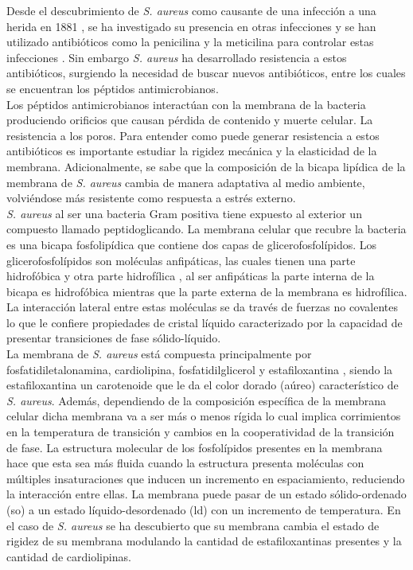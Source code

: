 \documentclass[%
 reprint,
 amsmath,amssymb,
 aps,
]{revtex4-2}
\begin{document}
Desde el descubrimiento de \textit{S. aureus} como causante de una infecci\'{o}n a una herida en 1881 \cite{Orent2006AMagazine}, se ha investigado su presencia en otras infecciones y se han utilizado antibi\'{o}ticos como la penicilina y la meticilina para controlar estas infecciones \cite{1HarpavatS.NissimS.LipppincottsMicrocards:MicrobiologyFlashCards2012.}. Sin embargo \textit{S. aureus} ha desarrollado resistencia a estos antibi\'{o}ticos,  surgiendo la necesidad de buscar nuevos antibi\'{o}ticos, entre los cuales se encuentran los p\'{e}ptidos antimicrobianos.\\
Los p\'{e}ptidos antimicrobianos interact\'{u}an con la membrana de la bacteria produciendo orificios que causan p\'{e}rdida de contenido y muerte celular. La resistencia a los poros. Para entender como puede generar resistencia a estos antibi\'{o}ticos es importante estudiar la rigidez mec\'{a}nica y la elasticidad de la membrana. Adicionalmente, se sabe que la composici\'{o}n de la bicapa lip\'{i}dica de la membrana de \textit{S. aureus} cambia de manera adaptativa al medio ambiente, volvi\'{e}ndose m\'{a}s resistente como respuesta a estr\'{e}s externo.\\
\textit{S. aureus} al ser una bacteria Gram positiva tiene expuesto al exterior un compuesto llamado peptidoglicando. La membrana celular que recubre la bacteria es una bicapa fosfolip\'{i}dica que contiene dos capas de glicerofosfol\'{i}pidos. Los glicerofosfol\'{i}pidos son mol\'{e}culas anfip\'{a}ticas, las cuales tienen una parte hidrof\'{o}bica y otra parte hidrof\'{i}lica \cite{Nelson2011}, al ser anfip\'{a}ticas la parte interna de la bicapa es hidrof\'{o}bica mientras que la parte externa de la membrana es hidrof\'{i}lica. La interacci\'{o}n lateral entre estas mol\'{e}culas se da trav\'{e}s de fuerzas no covalentes lo que le confiere propiedades de cristal l\'{i}quido caracterizado por la capacidad de presentar transiciones de fase s\'{o}lido-l\'{i}quido. \\
La membrana de \textit{S. aureus} est\'{a} compuesta principalmente por  fosfatidiletalonamina, cardiolipina, fosfatidilglicerol y estafiloxantina \cite{Ocampo2010TheAureus}, siendo la estafiloxantina un carotenoide que le da el color dorado (a\'{u}reo) caracter\'{i}stico de \textit{S. aureus}. Adem\'{a}s, dependiendo de la composici\'{o}n espec\'{i}fica de la membrana celular dicha membrana va a ser m\'{a}s o menos r\'{i}gida lo cual implica corrimientos en la temperatura de transici\'{o}n y cambios en la cooperatividad de la transici\'{o}n de fase. La estructura molecular de los fosfol\'{i}pidos presentes en la membrana hace que esta sea m\'{a}s fluida cuando la estructura presenta mol\'{e}culas con m\'{u}ltiples insaturaciones que inducen un incremento en espaciamiento, reduciendo la interacci\'{o}n entre ellas. La membrana puede pasar de un estado s\'{o}lido-ordenado (so) a un estado l\'{i}quido-desordenado (ld) con un incremento de temperatura. En el caso de \textit{S. aureus} se ha descubierto que su membrana cambia el estado de rigidez de su membrana modulando la cantidad de estafiloxantinas presentes y la cantidad de cardiolipinas. \\
\end{document}
